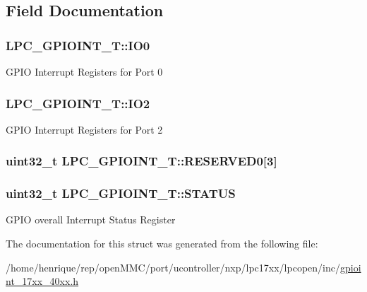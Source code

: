 \subsection{Field Documentation}
\hypertarget{structLPC__GPIOINT__T_a4edac525fb01aae7b57c4bcc9563ae27}{
\subsubsection[{I\-O0}]{ L\-P\-C\-\_\-\-G\-P\-I\-O\-I\-N\-T\-\_\-\-T\-::\-I\-O0}}\label{structLPC__GPIOINT__T_a4edac525fb01aae7b57c4bcc9563ae27}
G\-P\-I\-O Interrupt Registers for Port 0 \hypertarget{structLPC__GPIOINT__T_a1300843bc75ee56c6177f05f69b23ef8}{
\subsubsection[{I\-O2}]{ L\-P\-C\-\_\-\-G\-P\-I\-O\-I\-N\-T\-\_\-\-T\-::\-I\-O2}}\label{structLPC__GPIOINT__T_a1300843bc75ee56c6177f05f69b23ef8}
G\-P\-I\-O Interrupt Registers for Port 2 \hypertarget{structLPC__GPIOINT__T_a6afff78f3399fec13a72b78999cc6b80}{
\subsubsection[{R\-E\-S\-E\-R\-V\-E\-D0}]{\setlength{\rightskip}{0pt plus 5cm}uint32\-\_\-t L\-P\-C\-\_\-\-G\-P\-I\-O\-I\-N\-T\-\_\-\-T\-::\-R\-E\-S\-E\-R\-V\-E\-D0\mbox{[}3\mbox{]}}}\label{structLPC__GPIOINT__T_a6afff78f3399fec13a72b78999cc6b80}
\hypertarget{structLPC__GPIOINT__T_a9547c1d447b762a819920fe2a10c5029}{
\subsubsection[{S\-T\-A\-T\-U\-S}]{ uint32\-\_\-t L\-P\-C\-\_\-\-G\-P\-I\-O\-I\-N\-T\-\_\-\-T\-::\-S\-T\-A\-T\-U\-S}}\label{structLPC__GPIOINT__T_a9547c1d447b762a819920fe2a10c5029}
G\-P\-I\-O overall Interrupt Status Register 

The documentation for this struct was generated from the following file\-:\begin{DoxyCompactItemize}
\item 
/home/henrique/rep/open\-M\-M\-C/port/ucontroller/nxp/lpc17xx/lpcopen/inc/\hyperlink{gpioint__17xx__40xx_8h}{gpioint\-\_\-17xx\-\_\-40xx.\-h}\end{DoxyCompactItemize}
